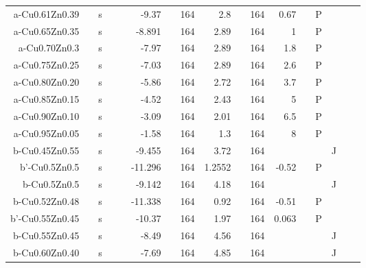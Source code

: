 \begin{table}[htbp]
\begin{adjustbox}{width=1\textwidth}
\begin{tabular}{rrrrrrrrrrrrrrrrr}
    a-Cu0.61Zn0.39 &       & s     &       &       & -9.37 &       & 164   & 2.8   &       & 164   & 0.67  &       & P     &       &       &  \\
    a-Cu0.65Zn0.35 &       & s     &       &       & -8.891 &       & 164   & 2.89  &       & 164   & 1     &       & P     &       &       &  \\
    a-Cu0.70Zn0.3 &       & s     &       &       & -7.97 &       & 164   & 2.89  &       & 164   & 1.8   &       & P     &       &       &  \\
    a-Cu0.75Zn0.25 &       & s     &       &       & -7.03 &       & 164   & 2.89  &       & 164   & 2.6   &       & P     &       &       &  \\
    a-Cu0.80Zn0.20 &       & s     &       &       & -5.86 &       & 164   & 2.72  &       & 164   & 3.7   &       & P     &       &       &  \\
    a-Cu0.85Zn0.15 &       & s     &       &       & -4.52 &       & 164   & 2.43  &       & 164   & 5     &       & P     &       &       &  \\
    a-Cu0.90Zn0.10 &       & s     &       &       & -3.09 &       & 164   & 2.01  &       & 164   & 6.5   &       & P     &       &       &  \\
    a-Cu0.95Zn0.05 &       & s     &       &       & -1.58 &       & 164   & 1.3   &       & 164   & 8     &       & P     &       &       &  \\
    b-Cu0.45Zn0.55 &       & s     &       &       & -9.455 &       & 164   & 3.72  &       & 164   &       &       &       & J     &       &  \\
    b'-Cu0.5Zn0.5 &       & s     &       &       & -11.296 &       & 164   & 1.2552 &       & 164   & -0.52 &       & P     &       &       &  \\
    b-Cu0.5Zn0.5 &       & s     &       &       & -9.142 &       & 164   & 4.18  &       & 164   &       &       &       & J     &       &  \\
    b-Cu0.52Zn0.48 &       & s     &       &       & -11.338 &       & 164   & 0.92  &       & 164   & -0.51 &       & P     &       &       &  \\
    b'-Cu0.55Zn0.45 &       & s     &       &       & -10.37 &       & 164   & 1.97  &       & 164   & 0.063 &       & P     &       &       &  \\
    b-Cu0.55Zn0.45 &       & s     &       &       & -8.49 &       & 164   & 4.56  &       & 164   &       &       &       & J     &       &  \\
    b-Cu0.60Zn0.40 &       & s     &       &       & -7.69 &       & 164   & 4.85  &       & 164   &       &       &       & J     &       &  \\

\end{tabular}
\end{adjustbox}
\end{table}
